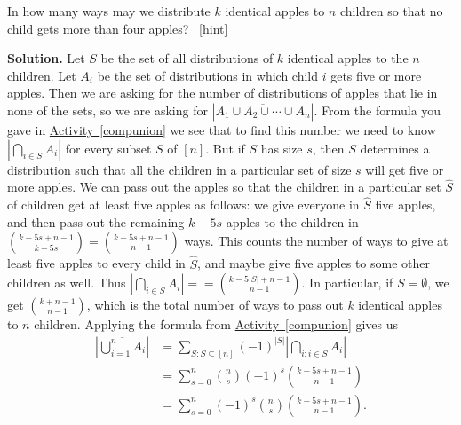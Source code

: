 \documentclass{book}
\begin{document}
\setcounter{project}{225}
\addtocounter{project}{-1}
\begin{activity}[]\label{act_restrictedmultisetspie}
\hypertarget{p-1272}{}%
In how many ways may we distribute \(k\) identical apples to \(n\) children so that no child gets more than four apples?%
~\hfill{\tiny\hyperlink{a-225}{[hint]}\hypertarget{q-225}{}}\par\smallskip%
\noindent\textbf{Solution.}\hypertarget{solution-161}{}\quad%
\hypertarget{p-1274}{}%
Let \(S\) be the set of all distributions of \(k\) identical apples to the \(n\) children. Let \(A_i\) be the set of distributions in which child \(i\) gets five or more apples. Then we are asking for the number of distributions of apples that lie in none of the sets, so we are asking for \(|\overline{A_1\cup A_2\cup \cdots \cup A_n}|\). From the formula you gave in \hyperref[compunion]{Activity~\ref{compunion}} we see that to find this number we need to know \(|\bigcap_{i\in S}A_i|\) for every subset \(S\) of \([n]\). But if \(S\) has size \(s\), then \(S\) determines a distribution such that all the children in a particular set of size \(s\) will get five or more apples. We can pass out the apples so that the children in a particular set \(\hat S\) of children get at least five apples as follows: we give everyone in \(\hat
S\) five apples, and then pass out the remaining \(k-5s\) apples to the children in \(\binom{k-5s+n-1}{k-5s}= \binom{k-5s+n-1}{n-1}\) ways. This counts the number of ways to give at least five apples to every child in \(\hat S\), and maybe give five apples to some other children as well. Thus \(|\bigcap_{i\in S}A_i| = = \binom{k-5|S|+n-1}{n-1}\). In particular, if \(S=\emptyset\), we get \(\binom{k+n-1}{n-1}\), which is the total number of ways to pass out \(k\) identical apples to \(n\) children. Applying the formula from \hyperref[compunion]{Activity~\ref{compunion}} gives us%
\begin{align*}
\left| \overline{\bigcup_{i=1}^n A_i}\right|&= \sum_{S:S\subseteq [n]}(-1)^{|S|}\left|\bigcap _{i\colon i\in S} A_i\right|\\
&= \sum_{s=0}^n \binom{n}{s}(-1)^s \binom{k-5s+n-1}{n-1}\\
&= \sum_{s=0}^n (-1)^s\binom{n}{s}\binom{k-5s+n-1}{n-1}\text{.}
\end{align*}
%
\end{activity}
\end{document}
